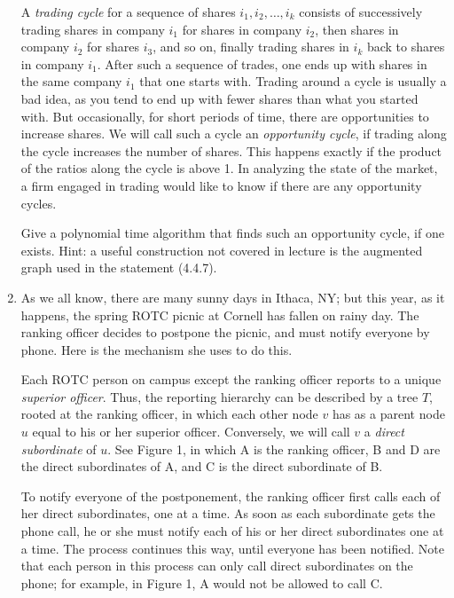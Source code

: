 \documentclass[12pt]{article}
\begin{document}
\begin{enumerate}
A {\em trading cycle} for a sequence of shares $i_1,i_2,\ldots,i_k$ consists
of successively trading shares in company $i_1$
for shares in company $i_2$, then shares in company $i_2$ for
shares $i_3$, and so on,
finally trading shares in $i_k$ back to shares in company $i_1$. After
such a sequence of trades, one ends up with shares in the same company
$i_1$ that one starts with. Trading around a cycle is usually a bad idea,
as you tend to end up with fewer shares than what you started with.  But
occasionally, for short periods of time, there are opportunities to
increase shares.  We will call such a cycle an {\em opportunity cycle}, if
trading along the cycle increases the number of shares. This happens
exactly if the product of the ratios along the cycle is above 1. In analyzing
the state of the market, a firm engaged in trading would
like to know if there are any opportunity cycles.

Give a polynomial time algorithm that finds such an opportunity
cycle, if one exists.
Hint: a useful construction not covered in lecture is the augmented graph
used in the statement (4.4.7).


\item

As we all know, there are many sunny days in Ithaca, NY;
but this year, as it happens, the spring ROTC picnic at Cornell
has fallen on rainy day.
The ranking officer decides to postpone the picnic, and must
notify everyone by phone.
Here is the mechanism she uses to do this.

Each ROTC person on campus except the ranking officer
reports to a unique {\em superior officer}.
Thus, the reporting hierarchy can be described by
a tree $T$, rooted at the ranking officer, in which
each other node $v$ has as a parent node $u$ equal
to his or her superior officer.
Conversely, we will call $v$ a {\em direct subordinate} of $u$.
See Figure 1, in which A is the ranking officer,
B and D are the direct subordinates of A,
and C is the direct subordinate of B.

To notify everyone of the postponement, the ranking officer
first calls each of her direct subordinates, one at a time.
As soon as each subordinate gets the phone call, he or she
must notify each of his or her direct subordinates one at a time.
The process continues this way, until everyone has been notified.
Note that each person in this process can only call
direct subordinates on the phone;
for example, in Figure 1, A would not be allowed to call C.


\end{enumerate}
\end{document}
